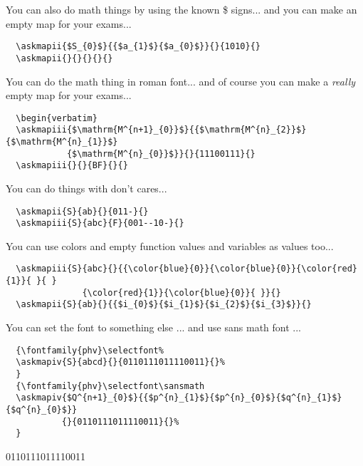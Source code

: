 \documentclass[a4paper,10pt]{ltxdoc}
\begin{document}
You can also do math things by using the known \$ signs... and you can make an
empty map for your exams...
\newpage
\begin{verbatim}
  \askmapii{$S_{0}$}{{$a_{1}$}{$a_{0}$}}{}{1010}{}
  \askmapii{}{}{}{}{}
\end{verbatim}
\askmapii{}{}{}{}{}
\bigskip\bigskip

You can do the math thing in roman font... and of course you can make a
\textsl{really} empty map for your exams...
\begin{verbatim}
  \begin{verbatim}
  \askmapiii{$\mathrm{M^{n+1}_{0}}$}{{$\mathrm{M^{n}_{2}}$}{$\mathrm{M^{n}_{1}}$}
            {$\mathrm{M^{n}_{0}}$}}{}{11100111}{}
  \askmapiii{}{}{BF}{}{}
\end{verbatim}
\bigskip\bigskip

You can do things with don't cares...
\begin{verbatim}
  \askmapii{S}{ab}{}{011-}{}
  \askmapiii{S}{abc}{F}{001--10-}{}
\end{verbatim}
\bigskip\bigskip

You can use colors and empty function values and variables as values too...
\begin{verbatim}
  \askmapiii{S}{abc}{}{{\color{blue}{0}}{\color{blue}{0}}{\color{red}{1}}{ }{ }
               {\color{red}{1}}{\color{blue}{0}}{ }}{}
  \askmapii{S}{ab}{}{{$i_{0}$}{$i_{1}$}{$i_{2}$}{$i_{3}$}}{}
\end{verbatim}
\bigskip

\newpage
You can set the font to something else ... and use sans math font ...
\begin{verbatim}
  {\fontfamily{phv}\selectfont%
  \askmapiv{S}{abcd}{}{0110111011110011}{}%
  }
  {\fontfamily{phv}\selectfont\sansmath
  \askmapiv{$Q^{n+1}_{0}$}{{$p^{n}_{1}$}{$p^{n}_{0}$}{$q^{n}_{1}$}{$q^{n}_{0}$}}
           {}{0110111011110011}{}%
  }
\end{verbatim}
{\selectfont%
%
}
{\selectfont\sansmath
{}
         {}{0110111011110011}{}%
}
\bigskip\bigskip
\end{document}
